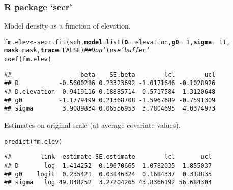 \documentclass[color=usenames,dvipsnames]{beamer}\usepackage[]{graphicx}\usepackage[]{color}
\makeatletter
\newcommand{\hlnum}[1]{\textcolor[rgb]{0.69,0.494,0}{#1}}%
\newcommand{\hlcom}[1]{\textcolor[rgb]{0.514,0.506,0.514}{\textit{#1}}}%
\newcommand{\hlopt}[1]{\textcolor[rgb]{0,0,0}{#1}}%
\newcommand{\hlstd}[1]{\textcolor[rgb]{0,0,0}{#1}}%
\newcommand{\hlkwb}[1]{\textcolor[rgb]{0,0.341,0.682}{#1}}%
\newcommand{\hlkwc}[1]{\textcolor[rgb]{0,0,0}{\textbf{#1}}}%
\newcommand{\hlkwd}[1]{\textcolor[rgb]{0.004,0.004,0.506}{#1}}%
\newenvironment{kframe}{%
 \def\at@end@of@kframe{}%
 \ifinner\ifhmode%
  \def\at@end@of@kframe{\end{minipage}}%
  \begin{minipage}{\columnwidth}%
 \fi\fi%
 \def\FrameCommand##1{\hskip\@totalleftmargin \hskip-\fboxsep
 \colorbox{shadecolor}{##1}\hskip-\fboxsep
     \hskip-\linewidth \hskip-\@totalleftmargin \hskip\columnwidth}%
 \MakeFramed {\advance\hsize-\width
   \@totalleftmargin\z@ \linewidth\hsize
   \@setminipage}}%
 {\par\unskip\endMakeFramed%
 \at@end@of@kframe}
\newenvironment{knitrout}{}{} %
\makeatother
\begin{document}
\begin{frame}[fragile]
  \frametitle{R package `secr'}
  Model density as a function of elevation. 
\begin{knitrout}\scriptsize
{}\color{fgcolor}\begin{kframe}
\begin{alltt}
\hlstd{fm.elev} \hlkwb{<-} \hlkwd{secr.fit}\hlstd{(sch,} \hlkwc{model}\hlstd{=}\hlkwd{list}\hlstd{(}\hlkwc{D}\hlstd{=}\hlopt{~}\hlstd{elevation,} \hlkwc{g0}\hlstd{=}\hlopt{~}\hlnum{1}\hlstd{,} \hlkwc{sigma}\hlstd{=}\hlopt{~}\hlnum{1}\hlstd{),}
                    \hlkwc{mask}\hlstd{=mask,} \hlkwc{trace}\hlstd{=}\hlnum{FALSE}\hlstd{)}  \hlcom{## Don't use 'buffer'}
\hlkwd{coef}\hlstd{(fm.elev)}
\end{alltt}
\begin{verbatim}
##                   beta    SE.beta        lcl        ucl
## D           -0.5600286 0.23323692 -1.0171646 -0.1028926
## D.elevation  0.9419116 0.18885714  0.5717584  1.3120648
## g0          -1.1779499 0.21368708 -1.5967689 -0.7591309
## sigma        3.9089834 0.06556953  3.7804695  4.0374973
\end{verbatim}
\end{kframe}
\end{knitrout}
\pause
\vfill
Estimates on original scale (at average covariate values).
\begin{knitrout}\scriptsize
{}\color{fgcolor}\begin{kframe}
\begin{alltt}
\hlkwd{predict}\hlstd{(fm.elev)}
\end{alltt}
\begin{verbatim}
##        link  estimate SE.estimate        lcl       ucl
## D       log  1.414252  0.19670665  1.0782035  1.855037
## g0    logit  0.235421  0.03846324  0.1684337  0.318835
## sigma   log 49.848252  3.27204265 43.8366192 56.684304
\end{verbatim}
\end{kframe}
\end{knitrout}
\end{frame}
\end{document}
